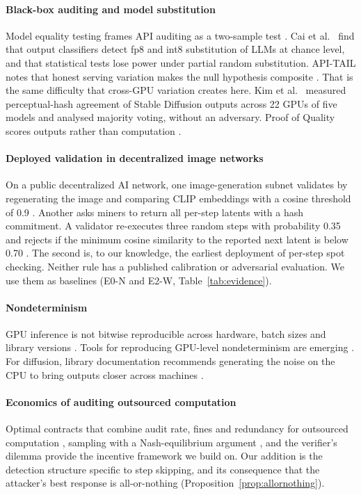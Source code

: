 \documentclass[preprint,review,12pt,authoryear]{elsarticle}
\theoremstyle{definition}
\begin{document}
\paragraph{Black-box auditing and model substitution}
Model equality testing frames API auditing as a two-sample test \citep{gao2025met}. Cai et al.\ \citep{cai2025substitution} find that output classifiers detect fp8 and int8 substitution of LLMs at chance level, and that statistical tests lose power under partial random substitution. API-TAIL notes that honest serving variation makes the null hypothesis composite \citep{apitail2026}. That is the same difficulty that cross-GPU variation creates here. Kim et al.\ \citep{kim2024reproducibility} measured perceptual-hash agreement of Stable Diffusion outputs across 22 GPUs of five models and analysed majority voting, without an adversary. Proof of Quality scores outputs rather than computation \citep{poq2024}.

\paragraph{Deployed validation in decentralized image networks}
On a public decentralized AI network, one image-generation subnet validates by regenerating the image and comparing CLIP embeddings with a cosine threshold of 0.9 \citep{nicheimage_repo}. Another asks miners to return all per-step latents with a hash commitment. A validator re-executes three random steps with probability 0.35 and rejects if the minimum cosine similarity to the reported next latent is below 0.70 \citep{wombo_repo}. The second is, to our knowledge, the earliest deployment of per-step spot checking. Neither rule has a published calibration or adversarial evaluation. We use them as baselines (E0-N and E2-W, Table~\ref{tab:evidence}).

\paragraph{Nondeterminism}
GPU inference is not bitwise reproducible across hardware, batch sizes and library versions \citep{diffusers_repro,atil2024nondeterminism,he2025nondeterminism,yuan2025nondeterminism}. Tools for reproducing GPU-level nondeterminism are emerging \citep{hawkeye2026}. For diffusion, library documentation recommends generating the noise on the CPU to bring outputs closer across machines \citep{diffusers_repro}.

\paragraph{Economics of auditing outsourced computation}
Optimal contracts that combine audit rate, fines and redundancy for outsourced computation \citep{pham2014contracts}, sampling with a Nash-equilibrium argument \citep{zhang2024posp}, and the verifier's dilemma \citep{teutsch2019truebit,verifierdilemma2024} provide the incentive framework we build on. Our addition is the detection structure specific to step skipping, and its consequence that the attacker's best response is all-or-nothing (Proposition~\ref{prop:allornothing}).
\end{document}
